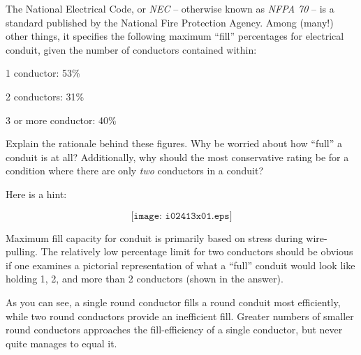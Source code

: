 

The National Electrical Code, or {\it NEC} -- otherwise known as {\it NFPA 70} -- is a standard published by the National Fire Protection Agency.  Among (many!) other things, it specifies the following maximum ``fill'' percentages for electrical conduit, given the number of conductors contained within:

\vskip 10pt

1 conductor: 53\%

\vskip 10pt

2 conductors: 31\%

\vskip 10pt

3 or more conductor: 40\%

\vskip 10pt

Explain the rationale behind these figures.  Why be worried about how ``full'' a conduit is at all?  Additionally, why should the most conservative rating be for a condition where there are only {\it two} conductors in a conduit?







Here is a hint:

$$\texttt{[image: i02413x01.eps]}$$







Maximum fill capacity for conduit is primarily based on stress during wire-pulling.  The relatively low percentage limit for two conductors should be obvious if one examines a pictorial representation of what a ``full'' conduit would look like holding 1, 2, and more than 2 conductors (shown in the answer).

As you can see, a single round conductor fills a round conduit most efficiently, while two round conductors provide an inefficient fill.  Greater numbers of smaller round conductors approaches the fill-efficiency of a single conductor, but never quite manages to equal it.




